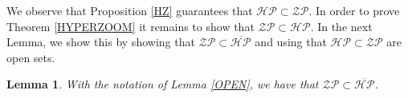 \documentclass[12pt,a4paper]{amsart}
\theoremstyle{plain}
\newtheorem{lemma}{Lemma}[subsection]
\begin{document}

We observe that Proposition \ref{HZ} guarantees that $\mathcal{HP} \subset \mathcal{ZP}$. In order to prove Theorem \ref{HYPERZOOM} it remains to show that $\mathcal{ZP} \subset \mathcal{HP}$. In the next Lemma, we show this by showing that $\mathcal{ZP} \subset \overline{\mathcal{HP}}$ and using that $\mathcal{HP} \subset \mathcal{ZP}$ are open sets.

\begin{lemma}\label{ZOOMHYPER}
	With the notation of Lemma \ref{OPEN}, we have that $\mathcal{ZP} \subset \overline{\mathcal{HP}}$. 
\end{lemma}
\end{document}
